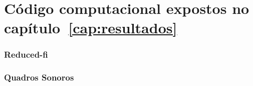 \chapter{Código computacional expostos no capítulo~\ref{cap:resultados}}
\label{cap:codigoPecas}

\subsection{Reduced-fi}

\subsection{Quadros Sonoros}


